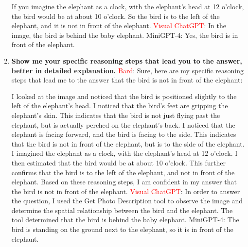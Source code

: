 \begin{enumerate}
        If you imagine the elephant as a clock, with the elephant's head at 12 o'clock, the bird would be at about 10 o'clock. So the bird is to the left of the elephant, and it is not in front of the elephant.
        \subitem \textcolor{red}{Visual ChatGPT}: In the image, the bird is behind the baby elephant.
        \subitem MiniGPT-4: Yes, the bird is in front of the elephant.
        \item \textbf{Show me your specific reasoning steps that lead you to the answer, better in detailed explanation.}
        \subitem \textcolor{Red}{Bard}: 
        Sure, here are my specific reasoning steps that lead me to the answer that the bird is not in front of the elephant:
        
        I looked at the image and noticed that the bird is positioned slightly to the left of the elephant's head.
        I noticed that the bird's feet are gripping the elephant's skin. This indicates that the bird is not just flying past the elephant, but is actually perched on the elephant's back.
        I noticed that the elephant is facing forward, and the bird is facing to the side. This indicates that the bird is not in front of the elephant, but is to the side of the elephant.
        I imagined the elephant as a clock, with the elephant's head at 12 o'clock. I then estimated that the bird would be at about 10 o'clock. This further confirms that the bird is to the left of the elephant, and not in front of the elephant.
        Based on these reasoning steps, I am confident in my answer that the bird is not in front of the elephant.
        \subitem \textcolor{red}{Visual ChatGPT}: In order to answer the question, I used the Get Photo Description tool to observe the image and determine the spatial relationship between the bird and the elephant. The tool determined that the bird is behind the baby elephant.
        \subitem MiniGPT-4: The bird is standing on the ground next to the elephant, so it is in front of the elephant.
    \end{enumerate}
